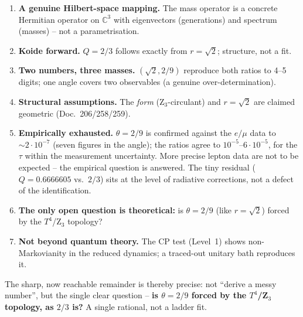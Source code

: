 \begin{important}
\begin{enumerate}
  \item \textbf{A genuine Hilbert-space mapping.} The mass operator is a
        concrete Hermitian operator on $\mathbb{C}^3$ with eigenvectors
        (generations) and spectrum (masses) -- not a parametrisation.
  \item \textbf{Koide forward.} $Q=2/3$ follows exactly from $r=\sqrt2$;
        structure, not a fit.
  \item \textbf{Two numbers, three masses.} $(\sqrt2,2/9)$ reproduce both
        ratios to 4--5 digits; one angle covers two observables (a genuine
        over-determination).
  \item \textbf{Structural assumptions.} The \emph{form} (Z$_3$-circulant) and
        $r=\sqrt2$ are claimed geometric (Doc.~206/258/259).
  \item \textbf{Empirically exhausted.} $\theta=2/9$ is confirmed against the
        $e/\mu$ data to $\sim2\cdot10^{-7}$ (seven figures in the angle); the
        ratios agree to $10^{-5}$--$6\cdot10^{-5}$, for the $\tau$ within the
        measurement uncertainty. More precise lepton data are not to be
        expected -- the empirical question is answered. The tiny residual
        ($Q=0.6666605$ vs.\ $2/3$) sits at the level of radiative corrections,
        not a defect of the identification.
  \item \textbf{The only open question is theoretical:} is $\theta=2/9$ (like
        $r=\sqrt2$) forced by the $T^4$/Z$_3$ topology?
  \item \textbf{Not beyond quantum theory.} The CP test (Level~1) shows
        non-Markovianity in the reduced dynamics; a traced-out unitary bath
        reproduces it.
\end{enumerate}
\end{important}

The sharp, now reachable remainder is thereby precise: not \enquote{derive a
messy number}, but the single clear question -- \textbf{is $\theta=2/9$ forced
by the $T^4$/Z$_3$ topology, as $2/3$ is?} A single rational, not a ladder fit.

